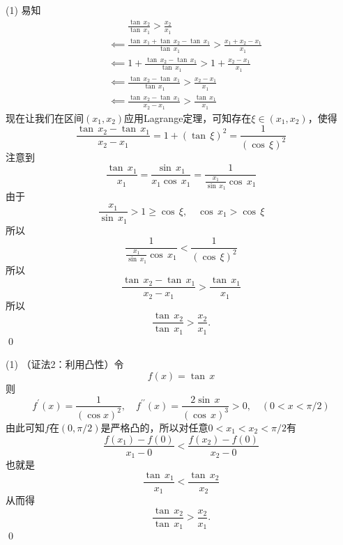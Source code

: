 (1) \prove 易知
\begin{align}
    &\mathrel{\phantom{\impliedby}} \frac{\tan \, x_2}{\tan \, x_1} > \frac{x_2}{x_1} \\
    &\impliedby \frac{\tan \, x_1 + \tan \, x_2 - \tan \, x_1}{\tan \, x_1} > \frac{x_1 + x_2 - x_1}{x_1} \\
    &\impliedby 1 + \frac{\tan \, x_2 - \tan \, x_1}{\tan \, x_1} > 1 + \frac{x_2 - x_1}{x_1} \\
    &\impliedby \frac{\tan \, x_2 - \tan \, x_1}{\tan \, x_1} > \frac{x_2-x_1}{x_1} \\
    &\impliedby \frac{\tan \, x_2 - \tan \, x_1}{x_2 - x_1} > \frac{\tan \, x_1}{x_1}
\end{align}
现在让我们在区间$(x_1,x_2)$应用Lagrange定理，可知存在$\xi \in (x_1,x_2)$，使得
\begin{equation}
    \frac{\tan \, x_2 - \tan \, x_1}{x_2 - x_1} = 1 + \left(\tan \, \xi\right)^2 = \frac{1}{\left(\cos \, \xi\right)^2}
\end{equation}
注意到
\begin{equation}
    \frac{\tan \, x_1}{x_1} = \frac{\sin \, x_1}{x_1 \cos \, x_1} = \frac{1}{\displaystyle\frac{x_1}{\sin \, x_1} \cos \, x_1}
\end{equation}
由于
\begin{equation}
    \frac{x_1}{\sin \, x_1} > 1 \geq \cos \, \xi, \quad \cos \, x_1 > \cos \, \xi
\end{equation}
所以
\begin{equation}
    \frac{1}{\displaystyle\frac{x_1}{\sin \, x_1}\cos \, x_1} < \frac{1}{\left(\cos \, \xi\right)^2} 
\end{equation}
所以
\begin{equation}
    \frac{\tan \, x_2 - \tan \, x_1}{x_2 - x_1} > \frac{\tan \, x_1}{x_1}
\end{equation}
所以
\begin{equation}
    \frac{\tan \, x_2}{\tan \, x_1} > \frac{x_2}{x_1}.
\end{equation}
\qed\bigskip

(1) \prove （证法2：利用凸性）令
\begin{equation}
    f(x) = \tan \, x
\end{equation}
则
\begin{equation}
    f^\prime (x) = \frac{1}{\left(\cos x\right)^2}, \quad f^{\prime\prime}(x) = \frac{2\sin \, x}{\left(\cos \, x\right)^3} > 0, \quad (0 < x < \pi/2)
\end{equation}
由此可知$f$在$(0,\pi/2)$是严格凸的，所以对任意$0 < x_1 < x_2 < \pi/2$有
\begin{equation}
    \frac{f(x_1)-f(0)}{x_1-0} < \frac{f(x_2)-f(0)}{x_2-0}
\end{equation}
也就是
\begin{equation}
    \frac{\tan \, x_1}{x_1} < \frac{\tan \, x_2}{x_2}
\end{equation}
从而得
\begin{equation}
    \frac{\tan \, x_2}{\tan \, x_1} > \frac{x_2}{x_1}.
\end{equation}
\qed\bigskip

